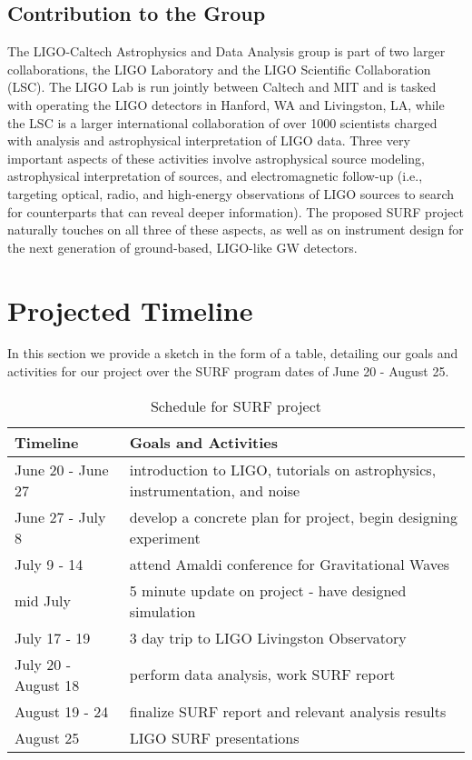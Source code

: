 \documentclass{article}
\begin{document}
\subsection*{Contribution to the Group}

The LIGO-Caltech Astrophysics and Data Analysis group is part of two larger collaborations, the LIGO Laboratory and the LIGO Scientific Collaboration (LSC). The LIGO Lab is run jointly between Caltech and MIT and is tasked with operating the LIGO detectors in Hanford, WA and Livingston, LA, while the LSC is a larger international collaboration of over 1000 scientists charged with analysis and astrophysical interpretation of LIGO data. Three very important aspects of these activities involve astrophysical source modeling, astrophysical interpretation of sources, and electromagnetic follow-up (i.e., targeting optical, radio, and high-energy observations of LIGO sources to search for counterparts that can reveal deeper information). The proposed SURF project naturally touches on all three of these aspects, as well as on instrument design for the next generation of ground-based, LIGO-like GW detectors.
   
\section{Projected Timeline}
In this section we provide a sketch in the form of a table, detailing our goals and activities for our project over the SURF program dates of June 20 - August 25. \\

\begin{table} [ht]
\caption{Schedule for SURF project}
\begin{tabular}{ p{3cm} p{10cm} }
 \hline
\centering Timeline & Goals and Activities \\ [0.5ex] 
 \hline
 \hline
June 20 - June 27 & introduction to LIGO, tutorials on astrophysics, instrumentation, and noise \\
June 27 - July 8 & develop a concrete plan for project, begin designing experiment \\
July 9 - 14 & attend Amaldi conference for Gravitational Waves \\
mid July & 5 minute update on project - have designed simulation \\
July 17 - 19 & 3 day trip to LIGO Livingston Observatory \\
July 20 - August 18 & perform data analysis, work SURF report \\
August 19 - 24 & finalize SURF report and relevant analysis results \\  
August 25 & LIGO SURF presentations \\
 \hline
\end{tabular}
\end{table}
\end{document}
